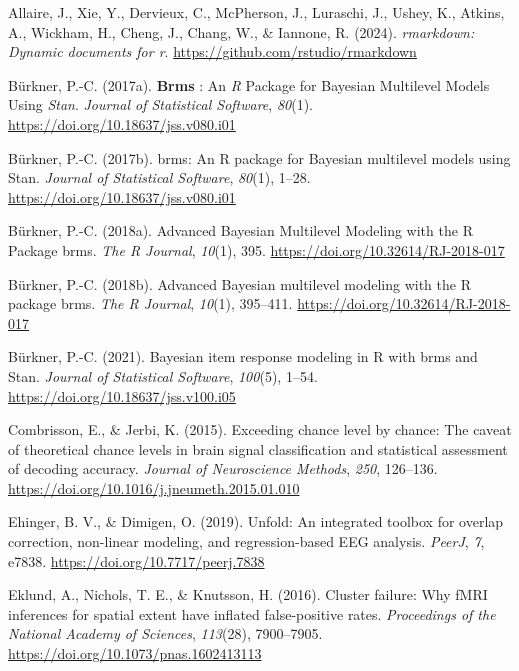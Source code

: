 \documentclass[
  doc,
  floatsintext,
  longtable,
  a4paper,
  nolmodern,
  notxfonts,
  notimes,
  colorlinks=true,linkcolor=blue,citecolor=blue,urlcolor=blue]{apa7}
\newlength{\cslhangindent}
\newenvironment{CSLReferences}[2] %
 {\begin{list}{}{%
  \setlength{\itemindent}{0pt}
  \setlength{\leftmargin}{0pt}
  \setlength{\parsep}{0pt}
  \ifodd #1
   \setlength{\leftmargin}{\cslhangindent}
   \setlength{\itemindent}{-1\cslhangindent}
  \fi
  \setlength{\itemsep}{#2\baselineskip}}}
 {\end{list}}
\begin{document}
\label{refs}
\begin{CSLReferences}{1}{0}
Allaire, J., Xie, Y., Dervieux, C., McPherson, J., Luraschi, J., Ushey,
K., Atkins, A., Wickham, H., Cheng, J., Chang, W., \& Iannone, R.
(2024). \emph{{rmarkdown}: Dynamic documents for r}.
\url{https://github.com/rstudio/rmarkdown}

Bürkner, P.-C. (2017a). \textbf{Brms} : {An} {{\emph{R}}} {Package} for
{Bayesian Multilevel Models Using} {{\emph{Stan}}}. \emph{Journal of
Statistical Software}, \emph{80}(1).
\url{https://doi.org/10.18637/jss.v080.i01}

Bürkner, P.-C. (2017b). {brms}: An {R} package for {Bayesian} multilevel
models using {Stan}. \emph{Journal of Statistical Software},
\emph{80}(1), 1--28. \url{https://doi.org/10.18637/jss.v080.i01}

Bürkner, P.-C. (2018a). Advanced {Bayesian Multilevel Modeling} with the
{R Package} brms. \emph{The R Journal}, \emph{10}(1), 395.
\url{https://doi.org/10.32614/RJ-2018-017}

Bürkner, P.-C. (2018b). Advanced {Bayesian} multilevel modeling with the
{R} package {brms}. \emph{The R Journal}, \emph{10}(1), 395--411.
\url{https://doi.org/10.32614/RJ-2018-017}

Bürkner, P.-C. (2021). Bayesian item response modeling in {R} with
{brms} and {Stan}. \emph{Journal of Statistical Software},
\emph{100}(5), 1--54. \url{https://doi.org/10.18637/jss.v100.i05}

Combrisson, E., \& Jerbi, K. (2015). Exceeding chance level by chance:
{The} caveat of theoretical chance levels in brain signal classification
and statistical assessment of decoding accuracy. \emph{Journal of
Neuroscience Methods}, \emph{250}, 126--136.
\url{https://doi.org/10.1016/j.jneumeth.2015.01.010}

Ehinger, B. V., \& Dimigen, O. (2019). Unfold: An integrated toolbox for
overlap correction, non-linear modeling, and regression-based {EEG}
analysis. \emph{PeerJ}, \emph{7}, e7838.
\url{https://doi.org/10.7717/peerj.7838}

Eklund, A., Nichols, T. E., \& Knutsson, H. (2016). Cluster failure: Why
fMRI inferences for spatial extent have inflated false-positive rates.
\emph{Proceedings of the National Academy of Sciences}, \emph{113}(28),
7900--7905. \url{https://doi.org/10.1073/pnas.1602413113}


\end{CSLReferences}
\end{document}
